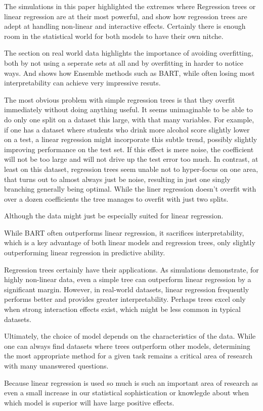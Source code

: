 \documentclass[12pt]{article}
\begin{document}
The simulations in this paper highlighted the extremes where Regression trees or linear regression are at their most powerful, and show how regression trees are adept at handling non-linear and interactive effects. Certainly there is enough room in the statistical world for both models to have their own nitche.

The section on real world data highlights the importance of avoiding overfitting, both by not using a seperate sets at all and by overfitting in harder to notice ways. And shows how Ensemble methods such as BART, while often losing most interpretability can achieve very impressive resuts.

The most obvious problem with simple regression trees is that they overfit immediately without doing anything useful. It seems unimaginable to be able to do only one split on a dataset this large, with that many variables. For example, if one has a dataset where students who drink more alcohol score slightly lower on a test, a linear regression might incorporate this subtle trend, possibly slightly improving performance on the test set. If this effect is mere noise, the coefficient will not be too large and will not drive up the test error too much. In contrast, at least on this dataset, regression trees seem unable not to hyper-focus on one area, that turns out to almost always just be noise, resulting in just one singly branching generally being optimal. While the liner regression doesn't overfit with over a dozen coefficients the tree manages to overfit with just two splits.

Although the data might just be especially suited for linear regression.

While BART often outperforms linear regression, it sacrifices interpretability, which is a key advantage of both linear models and regression trees, only slightly outperforming linear regression in predictive ability.

Regression trees certainly have their applications. As simulations demonstrate, for highly non-linear data, even a simple tree can outperform linear regression by a significant margin. However, in real-world datasets, linear regression frequently performs better and provides greater interpretability. Perhaps trees excel only when strong interaction effects exist, which might be less common in typical datasets.

Ultimately, the choice of model depends on the characteristics of the data. While one can always find datasets where trees outperform other models, determining the most appropriate method for a given task remains a critical area of research with many unanswered questions.

Because linear regression is used so much is such an important area of research as even a small increase in our statistical sophistication or knowlegde about when which model is superior will have large positive effects.



\end{document}
